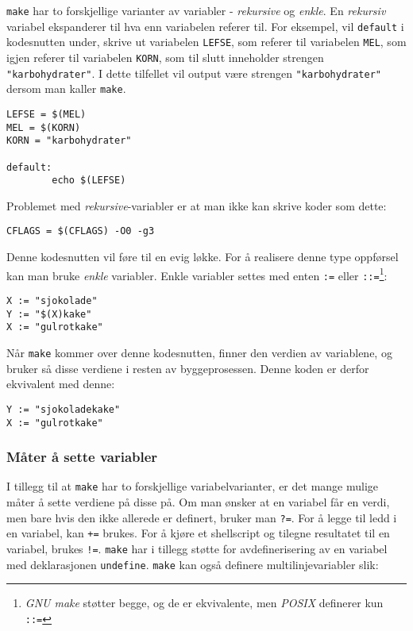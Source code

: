 \begin{alphasection}
\verb|make| har to forskjellige varianter av variabler - \textit{rekursive} og \textit{enkle}. En \textit{rekursiv} variabel ekspanderer til hva enn variabelen referer til. For eksempel, vil \verb|default| i kodesnutten under, skrive ut variabelen \verb|LEFSE|, som referer til variabelen \verb|MEL|, som igjen referer til variabelen \verb|KORN|, som til slutt inneholder strengen \verb|"karbohydrater"|. I dette tilfellet vil output være strengen \verb|"karbohydrater"| dersom man kaller \verb|make|.

\begin{lstlisting}
LEFSE = $(MEL)
MEL = $(KORN)
KORN = "karbohydrater"

default:
        echo $(LEFSE)
\end{lstlisting}

Problemet med \textit{rekursive}-variabler er at man ikke kan skrive koder som dette:

\begin{lstlisting}
CFLAGS = $(CFLAGS) -O0 -g3
\end{lstlisting}
Denne kodesnutten vil føre til en evig løkke. For å realisere denne type oppførsel kan man bruke \textit{enkle} variabler. Enkle variabler settes med enten \verb|:=| eller \verb|::=|\footnote{\textit{GNU make} støtter begge, og de er ekvivalente, men \textit{POSIX} definerer kun \texttt{::=}}:
\begin{lstlisting}
X := "sjokolade"
Y := "$(X)kake"
X := "gulrotkake"
\end{lstlisting}

Når \verb|make| kommer over denne kodesnutten, finner den verdien av variablene, og bruker så disse verdiene i resten av byggeprosessen. Denne koden er derfor ekvivalent med denne:

\begin{lstlisting}
Y := "sjokoladekake"
X := "gulrotkake"
\end{lstlisting}

\subsubsection{Måter å sette variabler}

I tillegg til at \verb|make| har to forskjellige variabelvarianter, er det mange mulige måter å sette verdiene på disse på. Om man ønsker at en variabel får en verdi, men bare hvis den ikke allerede er definert, bruker man \verb|?=|. For å legge til ledd i en variabel, kan \verb|+=| brukes. For å kjøre et shellscript og tilegne resultatet til en variabel, brukes \verb|!=|. \verb|make| har i tillegg støtte for avdefinerisering av en variabel med deklarasjonen \verb|undefine|. \verb|make| kan også definere multilinjevariabler slik:


\end{alphasection}
